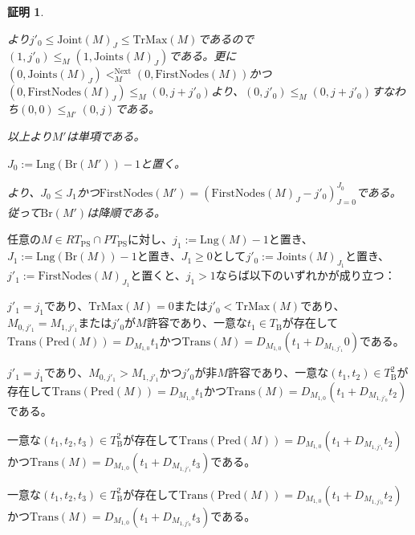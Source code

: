 \documentclass[dvipdfmx,uplatex]{jsarticle}
\theoremstyle{customnonumberbreakfortheorem}
\theoremstyle{customnonumberbreakforproof}
\newtheorem{hideableproof}{証明}
\begin{document}
\begin{hideableproof}
\begin{indented}
\begin{indented}
\begin{indented}
				\item {}より\(j'_0 \leq \textrm{Joint}(M)_J \leq \textrm{TrMax}(M)\)であるので\((1,j'_0) \leq_M (1,\textrm{Joints}(M)_J)\)である。更に\((0,\textrm{Joints}(M)_J) <_M^{\textrm{Next}} (0,\textrm{FirstNodes}(M))\)かつ\((0,\textrm{FirstNodes}(M)_J) \leq_M (0,j+j'_0)\)より、\((0,j'_0) \leq_M (0,j+j'_0)\)すなわち\((0,0) \leq_{M'} (0,j)\)である。
			\end{indented}
		\end{indented}
		\item 以上より\(M'\)は単項である。
		\item \(J_0 := \textrm{Lng}(\textrm{Br}(M'))-1\)と置く。
		\item {}より、\(J_0 \leq J_1\)かつ\(\textrm{FirstNodes}(M') = (\textrm{FirstNodes}(M)_J-j'_0)_{J=0}^{J_0}\)である。従って\(\textrm{Br}(M')\)は降順である。
	\end{indented}
\end{hideableproof}

\begin{lemma}\label{部分表現の単項成分とPredの関係}
	任意の\(M \in RT_{\textrm{PS}} \cap PT_{\textrm{PS}}\)に対し、\(j_1 := \textrm{Lng}(M)-1\)と置き、\(J_1 := \textrm{Lng}(\textrm{Br}(M))-1\)と置き、\(J_1 \geq 0\)として\(j'_0 := \textrm{Joints}(M)_{J_1}\)と置き、\(j'_1 := \textrm{FirstNodes}(M)_{J_1}\)と置くと、\(j_1 > 1\)ならば以下のいずれかが成り立つ：
	\begin{penumerate}
		\item \(j'_1 = j_1\)であり、\(\textrm{TrMax}(M) = 0\)または\(j'_0 < \textrm{TrMax}(M)\)であり、\(M_{0,j'_1} = M_{1,j'_1}\)または\(j'_0\)が\(M\)許容であり、一意な\(t_1 \in T_{\textrm{B}}\)が存在して\(\textrm{Trans}(\textrm{Pred}(M)) = D_{M_{1,0}} t_1\)かつ\(\textrm{Trans}(M) = D_{M_{1,0}}(t_1 + D_{M_{1,j'_1}} 0)\)である。
		\item \(j'_1 = j_1\)であり、\(M_{0,j'_1} > M_{1,j'_1}\)かつ\(j'_0\)が非\(M\)許容であり、一意な\((t_1,t_2) \in T_{\textrm{B}}^2\)が存在して\(\textrm{Trans}(\textrm{Pred}(M)) = D_{M_{1,0}} t_1\)かつ\(\textrm{Trans}(M) = D_{M_{1,0}}(t_1 + D_{M_{1,j'_0}} t_2)\)である。
		\item 一意な\((t_1,t_2,t_3) \in T_{\textrm{B}}^2\)が存在して\(\textrm{Trans}(\textrm{Pred}(M)) = D_{M_{1,0}}(t_1 + D_{M_{1,j'_1}} t_2)\)かつ\(\textrm{Trans}(M) = D_{M_{1,0}}(t_1 + D_{M_{1,j'_1}} t_3)\)である。
		\item 一意な\((t_1,t_2,t_3) \in T_{\textrm{B}}^2\)が存在して\(\textrm{Trans}(\textrm{Pred}(M)) = D_{M_{1,0}}(t_1 + D_{M_{1,j'_0}} t_2)\)かつ\(\textrm{Trans}(M) = D_{M_{1,0}}(t_1 + D_{M_{1,j'_0}} t_3)\)である。
	\end{penumerate}
\end{lemma}
\end{document}
